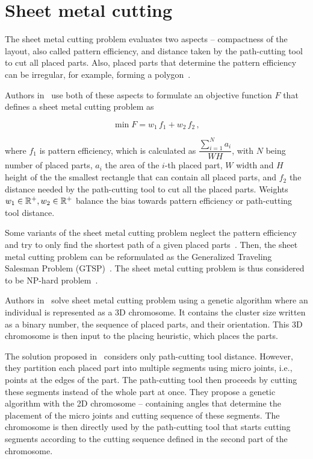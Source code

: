 \newpage
\section{Sheet metal cutting}\label{sec:sheet-metal-cutting}

The sheet metal cutting problem evaluates two aspects – compactness of the layout, also called pattern efficiency, and distance taken
by the path-cutting tool to cut all placed parts.
Also, placed parts that determine the pattern efficiency can be irregular, for example, forming a polygon~\cite{hajadLaserCuttingPath2019}.

Authors in~\cite{vijayanandHeuristicGeneticApproach2015}
use both of these aspects to formulate an objective function $F$ that defines a sheet metal cutting problem as

\begin{equation}
    \min F = w_1\,f_1 + w_2\,f_{2}\,,
    \label{eq:metal-sheet-cutting}
\end{equation}

where $f_1$ is pattern efficiency, which is calculated as $\dfrac{\sum\limits_{i=1}^{N}a_i}{WH}$,
with $N$ being number of placed parts, $a_i$ the area of the $i$-th placed part, $W$ width and $H$ height of the
the smallest rectangle that can contain all placed parts, and $f_2$ the distance
needed by the path-cutting tool to cut all the placed parts.
Weights $w_1 \in \operatorname*{\mathbb{R}^+}, w_2 \in \operatorname*{\mathbb{R}^+}$ balance the bias towards pattern efficiency or path-cutting tool distance.

Some variants of the sheet metal cutting problem neglect the pattern efficiency and try to only find the shortest
path of a given placed parts~\cite{kandasamyEffectiveLocationMicro2020}.
Then, the sheet metal cutting problem can be reformulated as the Generalized Traveling Salesman Problem (GTSP)~\cite{hajadLaserCuttingPath2019}.
The sheet metal cutting problem is thus considered to be NP-hard problem~\cite{vijayanandHeuristicGeneticApproach2015}.

Authors in~\cite{vijayanandHeuristicGeneticApproach2015} solve sheet metal cutting problem using a genetic algorithm
where an individual is represented as a 3D chromosome.
It contains the cluster size written as a binary number, the sequence of placed parts, and their orientation.
This 3D chromosome is then input to the placing heuristic, which places the parts.

The solution proposed in~\cite{kandasamyEffectiveLocationMicro2020} considers only path-cutting tool distance.
However, they partition each placed part into multiple segments using micro joints, i.e., points at the edges of the part.
The path-cutting tool then proceeds by cutting these segments instead of the whole part at once.
They propose a genetic algorithm with the 2D chromosome – containing angles that determine the placement of the micro joints and cutting sequence of these segments.
The chromosome is then directly used by the path-cutting tool that starts cutting segments according to the cutting sequence defined in the second part of the chromosome.